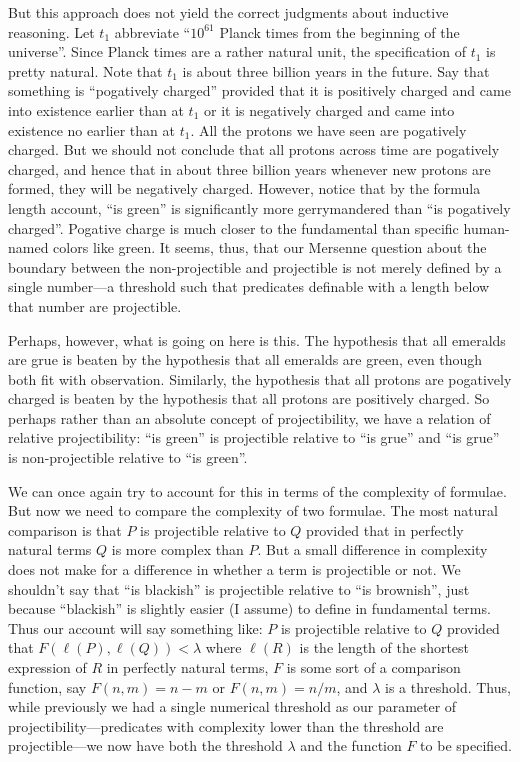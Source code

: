 But this approach does not yield the correct judgments about inductive reasoning. Let $t_1$ abbreviate ``$10^{61}$ Planck times from the beginning of
the universe''. Since Planck times are a rather natural unit, the specification of $t_1$ is pretty natural. Note
that $t_1$ is about three billion years in the future.  Say that something is ``pogatively charged'' provided that
it is positively charged and came into existence earlier than at $t_1$ or it is negatively charged and came into existence 
no earlier than at $t_1$. All the protons we have seen are pogatively charged. But we should not conclude that
all protons across time are pogatively charged, and hence that in about three billion years whenever new protons are formed,
they will be negatively charged. However, notice that by the formula length account, ``is green'' is significantly
more gerrymandered than ``is pogatively charged''. Pogative charge is much closer to the fundamental than specific
human-named colors like green. It seems, thus, that our Mersenne question
about the boundary between the non-projectible and projectible is not merely defined by a single number---a threshold such that
predicates definable with a length below that number are projectible. 

Perhaps, however, what is going on here is this. The hypothesis that all emeralds are grue is beaten by the hypothesis that 
all emeralds are green, even though both fit with observation. Similarly, the hypothesis that all protons are pogatively charged 
is beaten by the hypothesis that all protons are positively charged. So perhaps rather than an absolute concept of projectibility, we
have a relation of relative projectibility: ``is green'' is projectible relative to ``is grue'' and ``is grue'' is 
non-projectible relative to ``is green''. 

We can once again try to account for this in terms of the complexity of formulae. But now we need to compare the complexity of
two formulae. The most natural comparison is that $P$ is projectible relative to $Q$ provided that in perfectly
natural terms $Q$ is more complex than $P$. But a small difference in complexity does not make for a difference
in whether a term is projectible or not. We shouldn't say that ``is blackish'' is projectible relative to 
``is brownish'', just because ``blackish'' is slightly easier (I assume) to define in fundamental terms. 
Thus our account will say something like: $P$ is projectible relative to $Q$ provided that 
$F(\ell(P),\ell(Q))<\lambda$ where $\ell(R)$ is the length of the shortest expression of $R$ in perfectly
natural terms, $F$ is some sort of a comparison function, say $F(n,m)=n-m$ or $F(n,m)=n/m$, and $\lambda$ is
a threshold. Thus, while previously we had a single numerical threshold 
as our parameter of projectibility---predicates with complexity lower than the threshold are projectible---we now have 
both the threshold $\lambda$ and the function $F$ to be specified.

